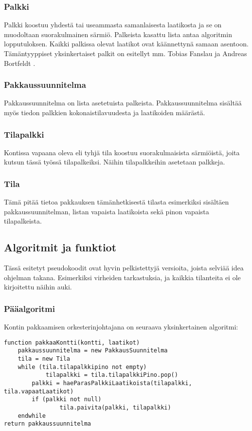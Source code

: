 \documentclass[a4paper,12pt, titlepage]{article}
\begin{document}
\subsubsection*{Palkki}
Palkki koostuu yhdestä tai useammasta samanlaisesta laatikosta ja se on muodoltaan suorakulmainen särmiö. Palkeista kasattu lista antaa algoritmin lopputuloksen. Kaikki palkissa olevat laatikot ovat käännettynä samaan asentoon. Tämäntyyppiset yksinkertaiset palkit on esitellyt mm. Tobias Fanslau ja Andreas Bortfeldt \cite[sivu 9]{fanslau-bortfeldt}.
\subsubsection*{Pakkaussuunnitelma}
Pakkaussuunnitelma on lista asetetuista palkeista. Pakkaussuunnitelma sisältää myös tiedon palkkien kokonaistilavuudesta ja laatikoiden määrästä.
\subsubsection*{Tilapalkki}
Kontissa vapaana oleva eli tyhjä tila koostuu suorakulmaisista särmiöistä, joita kutsun tässä työssä tilapalkeiksi. Näihin tilapalkkeihin asetetaan palkkeja.
\subsubsection*{Tila}
Tämä pitää tietoa pakkauksen tämänhetkisestä tilasta esimerkiksi sisältäen pakkaussuunnitelman, listan vapaista laatikoista sekä pinon vapaista tilapalkeista.
\subsection*{Algoritmit ja funktiot}
Tässä esitetyt pseudokoodit ovat hyvin pelkistettyjä versioita, joista selviää idea ohjelman takana. Esimerkiksi virheiden tarkastuksia, ja kaikkia tilanteita ei ole kirjoitettu näihin auki.
\subsubsection*{Pääalgoritmi}
Kontin pakkaamisen orkesterinjohtajana on seuraava yksinkertainen algoritmi:
\begin{verbatim}
function pakkaaKontti(kontti, laatikot) 
    pakkaussuunnitelma = new PakkausSuunnitelma
    tila = new Tila     
    while (tila.tilapalkkipino not empty)
        	tilapalkki = tila.tilapalkkiPino.pop()
        palkki = haeParasPalkkiLaatikoista(tilapalkki, tila.vapaatLaatikot)
        if (palkki not null)
        		tila.paivita(palkki, tilapalkki)
    endwhile
return pakkaussuunnitelma
\end{verbatim}
\end{document}
